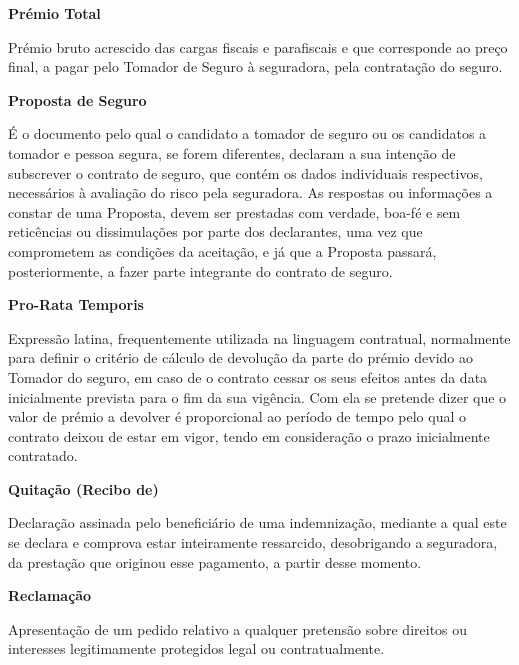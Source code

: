 \begin{description}
\item \textbf{Prémio Total}

Prémio bruto acrescido das cargas fiscais e parafiscais e que corresponde ao preço final, a pagar pelo Tomador de Seguro à seguradora, pela contratação do seguro.
\end{description}

\begin{description}
\item \textbf{Proposta de Seguro}

É o documento pelo qual o candidato a tomador de seguro ou os candidatos a tomador e pessoa segura, se forem diferentes, declaram a sua intenção de subscrever o contrato de seguro, que contém os dados individuais respectivos, necessários à avaliação do risco pela seguradora. As respostas ou informações a constar de uma Proposta, devem ser prestadas com verdade, boa-fé e sem reticências ou dissimulações por parte dos declarantes, uma vez que comprometem as condições da aceitação, e já que a Proposta passará, posteriormente, a fazer parte integrante do contrato de seguro.
\end{description}

\begin{description}
\item \textbf{Pro-Rata Temporis}

Expressão latina, frequentemente utilizada na linguagem contratual, normalmente para definir o critério de cálculo de devolução da parte do prémio devido ao Tomador do seguro, em caso de o contrato cessar os seus efeitos antes da data inicialmente prevista para o fim da sua vigência. Com ela se pretende dizer que o valor de prémio a devolver é proporcional ao período de tempo pelo qual o contrato deixou de estar em vigor, tendo em consideração o prazo inicialmente contratado.
\end{description}

\begin{description}
\item \textbf{Quitação (Recibo de)}

Declaração assinada pelo beneficiário de uma indemnização, mediante a qual este se declara e comprova estar inteiramente ressarcido, desobrigando a seguradora, da prestação que originou esse pagamento, a partir desse momento.
\end{description}

\begin{description}
\item \textbf{Reclamação}

Apresentação de um pedido relativo a qualquer pretensão sobre direitos ou interesses legitimamente protegidos legal ou contratualmente.
\end{description}

